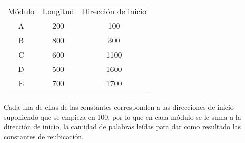 \documentclass[a4paper,12pt]{article}
\begin{document}
\begin{tabular}{c c c}
	Módulo & Longitud & Dirección de inicio \\
	A & 200 & 100 \\
	B & 800 & 300 \\
	C & 600 & 1100 \\
	D & 500 & 1600 \\
	E & 700 & 1700 \\\\
\end{tabular} 

	Cada una de ellas de las constantes corresponden a las direcciones de inicio suponiendo que se empieza en 100, por lo que en cada módulo se le suma a la dirección de inicio, la cantidad de palabras leídas para dar como resultado las constantes de reubicación.\\
\end{document}
